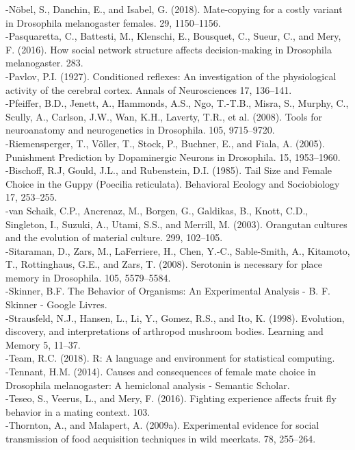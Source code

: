 \documentclass[a4paper, 12pt]{article}
\begin{document}
\begin{singlespace}
{-Nöbel, S., Danchin, E., and Isabel, G. (2018). Mate-copying for a costly variant in Drosophila melanogaster females. 29, 1150–1156.\\
-Pasquaretta, C., Battesti, M., Klenschi, E., Bousquet, C., Sueur, C., and Mery, F. (2016). How social network structure affects decision-making in Drosophila melanogaster. 283.\\
-Pavlov, P.I. (1927). Conditioned reflexes: An investigation of the physiological activity of the cerebral cortex. Annals of Neurosciences 17, 136–141.\\
-Pfeiffer, B.D., Jenett, A., Hammonds, A.S., Ngo, T.-T.B., Misra, S., Murphy, C., Scully, A., Carlson, J.W., Wan, K.H., Laverty, T.R., et al. (2008). Tools for neuroanatomy and neurogenetics in Drosophila. 105, 9715–9720.\\
-Riemensperger, T., Völler, T., Stock, P., Buchner, E., and Fiala, A. (2005). Punishment Prediction by Dopaminergic Neurons in Drosophila. 15, 1953–1960.\\
-Bischoff, R.J, Gould, J.L., and Rubenstein, D.I. (1985). Tail Size and Female Choice in the Guppy (Poecilia reticulata). Behavioral Ecology and Sociobiology 17, 253–255.\\
-van Schaik, C.P., Ancrenaz, M., Borgen, G., Galdikas, B., Knott, C.D., Singleton, I., Suzuki, A., Utami, S.S., and Merrill, M. (2003). Orangutan cultures and the evolution of material culture. 299, 102–105.\\
-Sitaraman, D., Zars, M., LaFerriere, H., Chen, Y.-C., Sable-Smith, A., Kitamoto, T., Rottinghaus, G.E., and Zars, T. (2008). Serotonin is necessary for place memory in Drosophila. 105, 5579–5584.\\
-Skinner, B.F. The Behavior of Organisms: An Experimental Analysis - B. F. Skinner - Google Livres.\\
-Strausfeld, N.J., Hansen, L., Li, Y., Gomez, R.S., and Ito, K. (1998). Evolution, discovery, and interpretations of arthropod mushroom bodies. Learning and Memory 5, 11–37.\\
-Team, R.C. (2018). R: A language and environment for statistical computing.\\
-Tennant, H.M. (2014). Causes and consequences of female mate choice in Drosophila melanogaster: A hemiclonal analysis - Semantic Scholar.\\
-Teseo, S., Veerus, L., and Mery, F. (2016). Fighting experience affects fruit fly behavior in a mating context. 103.\\
-Thornton, A., and Malapert, A. (2009a). Experimental evidence for social transmission of food acquisition techniques in wild meerkats. 78, 255–264.\\
}
\end{singlespace}
\end{document}
